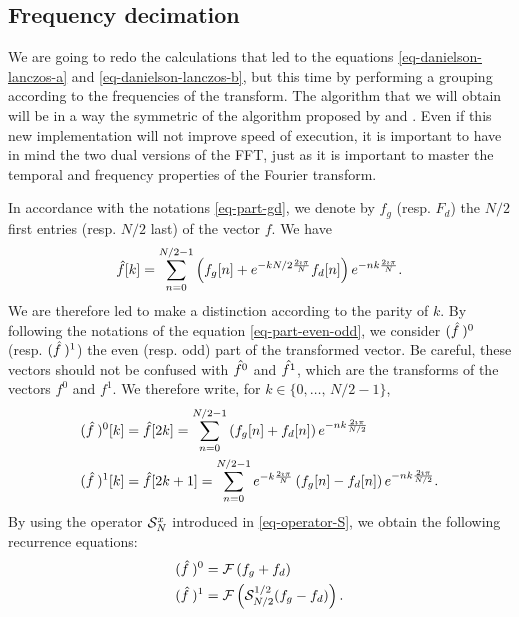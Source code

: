 \subsection{Frequency decimation}
\label{sect2-frequency-decimation} 
 
 
 We are going to redo the calculations that led to the equations \eqref{eq-danielson-lanczos-a} and \eqref{eq-danielson-lanczos-b}, but this time by performing a grouping according to the frequencies of the transform. The algorithm that we will obtain will be in a way the symmetric of the  algorithm proposed by  and . Even if this new implementation will not improve speed of execution, it is important to have in mind the two dual versions of the FFT, just as it is important to master the temporal and frequency properties of the Fourier transform.
 
 
In accordance with the notations \eqref{eq-part-gd}, we denote by $ f_g $ (resp. $ F_d $) the $ N / 2 $ first entries (resp. $ N / 2 $ last) of the vector $ f $. We have
\begin{equation*}
\hat{f}[k] = \sum_{n = 0}^{N / 2-1}{\left(f_g [n] + e^{- k N / 2 \frac{2 \imath \pi}{N}} f_d [n] \right) e^{- nk \frac{2 \imath \pi}{N}}}.
\end{equation*}
We are therefore led to make a distinction according to the parity of $ k $. By following the notations of the equation \eqref{eq-part-even-odd}, we consider $ (\hat{f} \:)^0 $ (resp. $ (\hat{f} \:)^1 $) the even (resp. odd) part of the transformed vector. Be careful, these vectors should not be confused with $ \hat{f^0} $ and $ \hat{f^1} $, which are the transforms of the vectors $ f^0 $ and $ f^1 $. We therefore write, for $ k \in \{0, \ldots, \, N / 2-1\} $,
\begin{align*}
(\hat{f} \:)^0 [k] & = \hat{f}[2k] = \sum_{n = 0}^{N / 2-1}{\left(f_g [n] + f_d [n] \right) e^{- nk \frac{2 \imath \pi}{N / 2}}} \\
(\hat{f} \:)^1 [k] & = \hat{f}[2k + 1] = \sum_{n = 0}^{N / 2-1}{e^{- k \frac{2 \imath \pi}{N}} \left(f_g [n] - f_d [n] \right) e^{- nk \frac{2 \imath \pi}{N / 2}}}.
\end{align*}
By using the operator $ \mathcal{S}_N^x $ introduced in \eqref{eq-operator-S}, we obtain the following recurrence equations:
\begin{align*}
(\hat{f} \:)^0 & = \mathcal{F} \left(f_g + f_d \right) \\
(\hat{f} \:)^1 & = \mathcal{F} \left(\mathcal{S}_{N / 2}^{1/2} (f_g - f_d) \right).
\end{align*}
 
